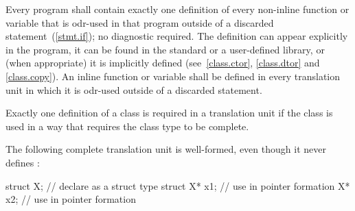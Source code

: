 \pnum
Every program shall contain exactly one definition of every non-inline
function or variable that is odr-used in that program
outside of a discarded statement~(\ref{stmt.if}); no diagnostic required.
The definition can appear explicitly in the program, it can be found in
the standard or a user-defined library, or (when appropriate) it is
implicitly defined (see~\ref{class.ctor}, \ref{class.dtor} and
\ref{class.copy}). An inline function or variable shall be defined in every
translation unit in which it is odr-used outside of a discarded statement.

\pnum
{}%
Exactly one definition of a class is required in a translation unit if
the class is used in a way that requires the class type to be complete.
\begin{example} The following complete translation unit is well-formed,
even though it never defines :

\begin{codeblock}
struct X;                       // declare  as a struct type
struct X* x1;                   // use  in pointer formation
X* x2;                          // use  in pointer formation
\end{codeblock}
\end{example}
